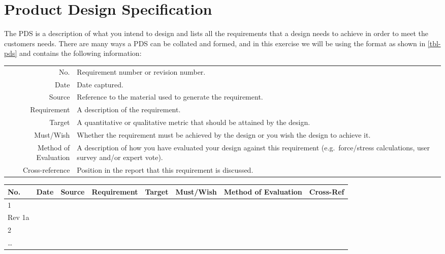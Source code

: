\section{Product Design Specification}

The \acf{PDS} is a description of what you intend to design and lists all the requirements that a design needs to achieve in order to meet the customers needs. 
There are many ways a \ac{PDS} can be collated and formed, and in this exercise we will be using the format as shown in \cref{tbl-pds} and contains the following information:


\begin{table}
  \small
\begin{tabular}{r p{}}
  No. & Requirement number or revision number. \\
  Date & Date captured. \\
  Source & Reference to the material used to generate the requirement. \\
  Requirement & A description of the requirement. \\
  Target & A quantitative or qualitative metric that should be attained by the design. \\
  Must/Wish & Whether the requirement must be achieved by the design or you wish the design to achieve it. \\ 
  Method of Evaluation & A description of how you have evaluated your design against this requirement (e.g.\ force/stress calculations, user survey and/or expert vote). \\
  Cross-reference & Position in the report that this requirement is discussed.
\end{tabular}
\end{table}

\begin{table*}[h!]
  \centering
  \caption{Product Design Specification Template}
  \label{tbl-pds}
  \begin{tabular}{l l l l l l l l}
    \toprule
    No. & Date & Source & Requirement & Target & Must/Wish & Method of Evaluation & Cross-Ref \\
    \midrule
    1 & & & & \\
    Rev 1a & & & & \\
    2 & & & & \\
    \ldots & & & & \\
    \bottomrule
  \end{tabular}
  \vspace{1em}
\end{table*}

